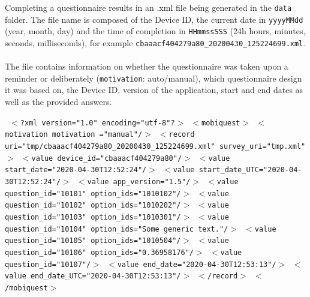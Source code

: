 \documentclass[11pt,a4paper,titlepage]{article}
\begin{document}
Completing a questionnaire results in an .xml file being generated in the \texttt{data} folder. The file name is composed of the Device ID, the current date in \texttt{yyyyMMdd} (year, month, day) and the time of completion in \texttt{HHmmssSSS} (24h hours, minutes, seconds, milliseconds), for example \texttt{cbaaacf404279a80\_20200430\_125224699.xml}.\\
\\
The file contains information on whether the questionnaire was taken upon a reminder or deliberately (\texttt{motivation}: auto/manual), which questionnaire design it was based on, the Device ID, version of the application, start and end dates as well as the provided answers.

\begin{center}
	\begin{tcolorbox}[colback=black!10!white,colframe=black!50!white, boxsep=1pt,left=4pt,right=4pt,top=4pt,bottom=2pt]
		\texttt{\noindent
			$<$?xml version="1.0" encoding="utf-8"?$>$\newline
			$<$mobiquest$>$\newline
			$<$motivation motivation ="manual"/$>$\newline
			$<$record uri="tmp/cbaaacf404279a80\_20200430\_125224699.xml"\newline
			\hspace*{0.5cm}survey\_uri="tmp.xml"$>$\newline
			$<$value device\_id="cbaaacf404279a80"/$>$\newline
			$<$value start\_date="2020-04-30T12:52:24"/$>$\newline
			$<$value start\_date\_UTC="2020-04-30T12:52:24"/$>$\newline
			$<$value app\_version="1.5"/$>$\newline
			$<$value question\_id="10101" option\_ids="1010102"/$>$\newline
			$<$value question\_id="10102" option\_ids="1010202"/$>$\newline
			$<$value question\_id="10103" option\_ids="1010301"/$>$\newline
			$<$value question\_id="10104" option\_ids="Some generic text."/$>$\newline
			$<$value question\_id="10105" option\_ids="1010504"/$>$\newline
			$<$value question\_id="10106" option\_ids="0.36958176"/$>$\newline
			$<$value question\_id="10107"/$>$\newline
			$<$value end\_date="2020-04-30T12:53:13"/$>$\newline
			$<$value end\_date\_UTC="2020-04-30T12:53:13"/$>$\newline
			$<$/record$>$\newline
			$<$/mobiquest$>$
		}
	\end{tcolorbox}
\end{center}
\end{document}
